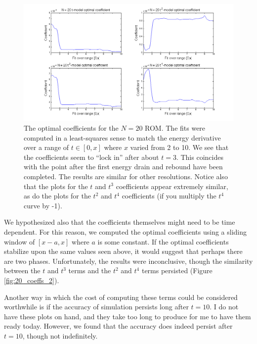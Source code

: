 \documentclass{article}
\begin{document}
\begin{figure}[h]
\includegraphics[width=\textwidth]{coeffs_20.png}
\caption{The optimal coefficients for the $N=20$ ROM. The fits were computed in a least-squares sense to match the energy derivative over a range of $t\in[0,x]$ where $x$ varied from 2 to 10. We see that the coefficients seem to ``lock in'' after about $t=3$. This coincides with the point after the first energy drain and rebound have been completed. The results are similar for other resolutions. Notice also that the plots for the $t$ and $t^3$ coefficients appear extremely similar, as do the plots for the $t^2$ and $t^4$ coefficients (if you multiply the $t^4$ curve by -1).}\label{fig:20_coeffs}
\end{figure}

We hypothesized also that the coefficients themselves might need to be time dependent. For this reason, we computed the optimal coefficients using a sliding window of $[x-a,x]$ where $a$ is some constant. If the optimal coefficients stabilize upon the same values seen above, it would suggest that perhaps there are two phases. Unfortunately, the results were inconclusive, though the similarity between the $t$ and $t^3$ terms and the $t^2$ and $t^4$ terms persisted (Figure \ref{fig:20_coeffs_2}).

Another way in which the cost of computing these terms could be considered worthwhile is if the accuracy of simulation persists long after $t=10$. I do not have these plots on hand, and they take too long to produce for me to have them ready today. However, we found that the accuracy does indeed persist after $t=10$, though not indefinitely.
\end{document}
